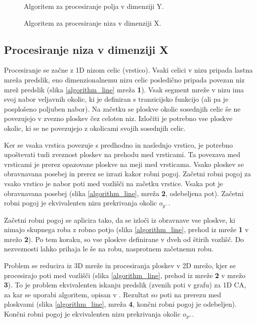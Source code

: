 \documentclass[12pt,a4paper,openany,twoside]{book}
\begin{document}
\begin{figure}[htb]
\centerline{}
\caption[Algoritem za procesiranje polja v dimenziji Y.]
{Algoritem za procesiranje polja v dimenziji Y.}
\label{algoritm_count-y}
\end{figure}

\begin{figure}[htb]
\centerline{}
\caption[Algoritem za procesiranje niza v dimenziji X.]
{Algoritem za procesiranje niza v dimenziji X.}
\label{algoritm_count-x}
\end{figure}

\subsection{Procesiranje niza v dimenziji X}

Procesiranje se začne z 1D nizom celic (vrstico).
Vsaki celici v nizu pripada lastna mreža predslik, eno dimenzionalnemu nizu celic
posledično pripada povezan niz mrež predslik (slika \ref{algorithm_line} mreža \textbf{1}).
Vsak segment mreže v nizu ima svoj nabor veljavnih okolic,
ki je definiran s tranzicijsko funkcijo (ali pa je posplošeno poljuben nabor).
Na začetku se ploskve okolic sosednjih celic še ne povezujejo v
zvezno ploskev čez celoten niz. Izločiti je potrebno vse ploskve okolic,
ki se ne povezujejo z okolicami svojih sosednjih celic.

Ker se vsaka vrstica povezuje s predhodno in naslednjo vrstico, je potrebno
upoštevati tudi zveznost ploskev na prehodu med vrsticami.
Ta povezava med vrsticami je prerez opazovane ploskve na meji med vrsticama.
Vsako ploskev se obravnavana posebej in prerez se izrazi kakor robni pogoj.
Začetni robni pogoj za vsako vrstico je nabor poti med vozlišči na začetku vrstice.
Vsaka pot je obravnavana posebej (slika \ref{algorithm_line}, mreža \textbf{2}, odebeljena pot).
Začetni robni pogoj je ekvivalenten nizu prekrivanja okolic \(o_{y^-}\).

Začetni robni pogoj se aplicira tako, da se izloči iz obravnave vse ploskve,
ki nimajo skupnega roba z robno potjo (slika \ref{algorithm_line},
prehod iz mreže \textbf{1} v mrežo \textbf{2}). Po tem koraku, so vse ploskve definirane
v dveh od štirih vozlišč. Do nezveznosti lahko prihaja le še na robu, nasprotnem
začetnemu robu.

Problem se reducira iz 3D mreže in procesiranja ploskev v
2D mrežo, kjer se procesirajo poti med vozlišči (slika \ref{algorithm_line},
prehod iz mreže \textbf{2} v mrežo \textbf{3}). To je problem ekvivalenten iskanju predslik
(zvenih poti v grafu) za 1D CA, za kar se uporabi algoritem, opisan v \cite{JerasDobnikar2007}.
Rezultat so poti na prerezu med ploskvami (slika \ref{algorithm_line}, mreža \textbf{4},
končni robni pogoj je odebeljen).
Končni robni pogoj je ekvivalenten nizu prekrivanja okolic \(o_{y^+}\).
\end{document}

